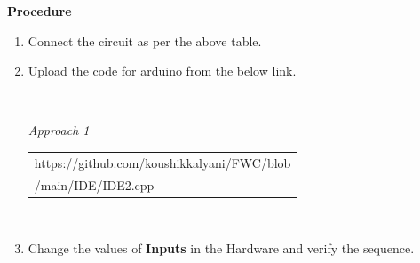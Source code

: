 \documentclass[journal,12pt,twocolumn]{IEEEtran}
\begin{document}
\textbf{Procedure}
\begin{enumerate}[label={\arabic*}.]
	\item Connect the circuit as per the above table.
	\item Upload the code for arduino from the below link.
		\vspace{\baselineskip}
                \begin{tabularx}{0.45\textwidth}{
				| >{\centering\arraybackslash}X|}
		\end{tabularx}
		\vspace{\baselineskip}\\
		\textit{Approach 1}
		\begin{tabularx}{0.45\textwidth}{| >{\centering\arraybackslash}X|}
			\hline
https://github.com/koushikkalyani/FWC/blob\\/main/IDE/IDE2.cpp\\
			\hline
		\end{tabularx}\\
		\vspace{\baselineskip}
	\item Change the values of \textbf{Inputs} in the Hardware and verify the sequence.
\end{enumerate}
\end{document}
